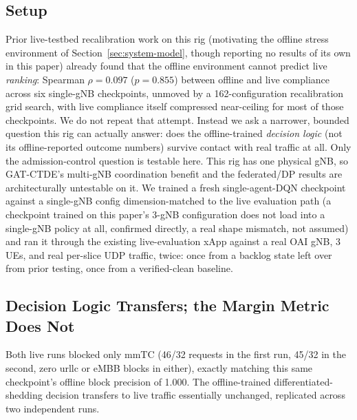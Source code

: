 \documentclass[journal]{IEEEtran}
\begin{document}
\subsection{Setup}
Prior live-testbed recalibration work on this rig (motivating the
offline stress environment of Section~\ref{sec:system-model}, though
reporting no results of its own in this paper) already found that the
offline environment cannot predict live \emph{ranking}: Spearman
$\rho=0.097$ ($p=0.855$) between offline and live compliance across six
single-gNB checkpoints, unmoved by a 162-configuration recalibration
grid search, with live compliance itself compressed near-ceiling for
most of those checkpoints. We do not repeat that attempt. Instead we
ask a narrower, bounded question this rig can actually answer: does the
offline-trained \emph{decision logic} (not its offline-reported
outcome numbers) survive contact with real traffic at all. Only the
admission-control question is testable here. This rig has one physical
gNB, so GAT-CTDE's multi-gNB coordination benefit and the federated/DP
results are architecturally untestable on it. We trained a fresh
single-agent-DQN checkpoint against a single-gNB config
dimension-matched to the live evaluation path (a checkpoint trained on
this paper's 3-gNB configuration does not load into a single-gNB policy
at all, confirmed directly, a real shape mismatch, not assumed) and
ran it through the existing live-evaluation xApp against a real OAI
gNB, 3 UEs, and real per-slice UDP traffic, twice: once from a
backlog state left over from prior testing, once from a verified-clean
baseline.

\subsection{Decision Logic Transfers; the Margin Metric Does Not}
Both live runs blocked only mmTC (46/32 requests in the first run,
45/32 in the second, zero urllc or eMBB blocks in either), exactly
matching this same checkpoint's offline block precision of 1.000. The
offline-trained differentiated-shedding decision transfers to live
traffic essentially unchanged, replicated across two independent runs.
\end{document}
